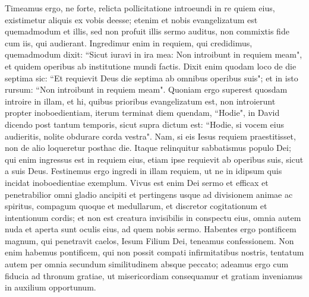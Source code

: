 \begin{biblechapter} 
\verse Timeamus ergo, ne forte, relicta pollicitatione introeundi in re quiem eius, existimetur aliquis ex vobis deesse; 
\verse etenim et nobis evangelizatum est quemadmodum et illis, sed non profuit illis sermo auditus, non commixtis fide cum iis, qui audierant. 
\verse Ingredimur enim in requiem, qui credidimus, quemadmodum dixit: “Sicut iuravi in ira mea: Non introibunt in requiem meam", et quidem operibus ab institutione mundi factis. 
\verse Dixit enim quodam loco de die septima sic: “Et requievit Deus die septima ab omnibus operibus suis"; 
\verse et in isto rursum: “Non introibunt in requiem meam". 
\verse Quoniam ergo superest quosdam introire in illam, et hi, quibus prioribus evangelizatum est, non introierunt propter inoboedientiam, 
\verse iterum terminat diem quendam, “Hodie", in David dicendo post tantum temporis, sicut supra dictum est: “Hodie, si vocem eius audieritis, nolite obdurare corda vestra". 
\verse Nam, si eis Iesus requiem praestitisset, non de alio loqueretur posthac die. 
\verse Itaque relinquitur sabbatismus populo Dei; 
\verse qui enim ingressus est in requiem eius, etiam ipse requievit ab operibus suis, sicut a suis Deus. 
\verse Festinemus ergo ingredi in illam requiem, ut ne in idipsum quis incidat inoboedientiae exemplum. 
\verse Vivus est enim Dei sermo et efficax et penetrabilior omni gladio ancipiti et pertingens usque ad divisionem animae ac spiritus, compagum quoque et medullarum, et discretor cogitationum et intentionum cordis; 
\verse et non est creatura invisibilis in conspectu eius, omnia autem nuda et aperta sunt oculis eius, ad quem nobis sermo. 
\verse Habentes ergo pontificem magnum, qui penetravit caelos, Iesum Filium Dei, teneamus confessionem. 
\verse Non enim habemus pontificem, qui non possit compati infirmitatibus nostris, tentatum autem per omnia secundum similitudinem absque peccato; 
\verse adeamus ergo cum fiducia ad thronum gratiae, ut misericordiam consequamur et gratiam inveniamus in auxilium opportunum. 
\end{biblechapter}

